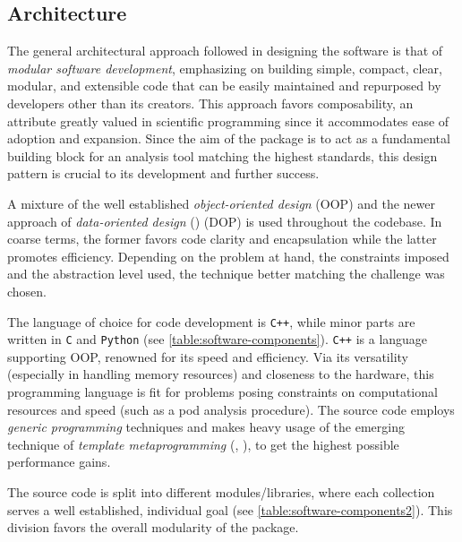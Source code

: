 \subsection{Architecture}\label{sec:the-software-architecture}
The general architectural approach followed in designing the software is that of 
\emph{modular software development}, emphasizing on building simple, compact, 
clear, modular, and extensible code that can be easily maintained and repurposed 
by developers other than its creators. This approach favors composability, an attribute 
greatly valued in scientific programming since it accommodates ease of adoption and 
expansion. Since the aim of the package is to act as a fundamental building block 
for an analysis tool matching the highest standards, this design pattern is crucial 
to its development and further success.

A mixture of the well established \emph{object-oriented design} (OOP) and the 
newer approach of \emph{data-oriented design} (\cite{Fabian2018}) (DOP) is used 
throughout the codebase. In coarse terms, the former favors code clarity and 
encapsulation while the latter promotes efficiency. Depending on the problem at 
hand, the constraints imposed and the abstraction level used, the technique better 
matching the challenge was chosen.

The language of choice for code development is \texttt{C++}, while minor parts 
are written in \texttt{C} and \texttt{Python} (see \autoref{table:software-components}). 
\texttt{C++} is a language supporting OOP, renowned for its speed and efficiency. 
Via its versatility (especially in handling memory resources) and closeness to 
the hardware, this programming language is fit for problems posing constraints on 
computational resources and speed (such as a \gls{pod} analysis procedure). The source 
code employs \emph{generic programming} techniques and makes heavy usage of the 
emerging technique of \emph{template metaprogramming} (\cite{Esterie2014}, 
\cite{Gawlik2018}), to get the highest possible performance gains.

The source code is split into different modules/libraries, where each collection 
serves a well established, individual goal (see \autoref{table:software-components2}). 
This division favors the overall modularity of the package.

